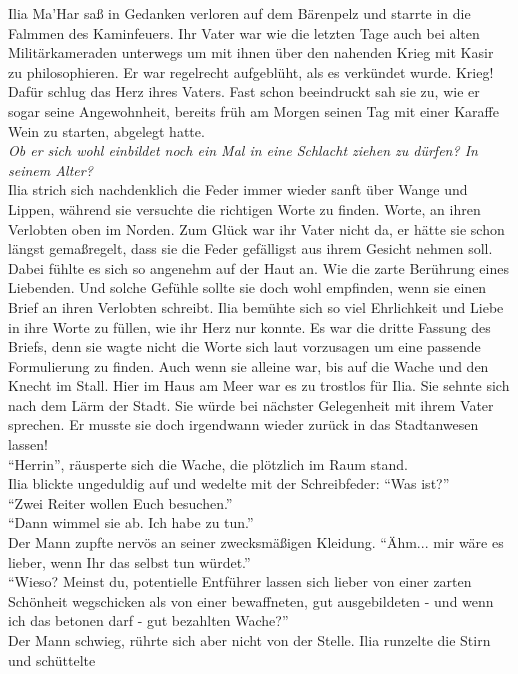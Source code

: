 Ilia Ma'Har saß in Gedanken verloren auf dem Bärenpelz und starrte in die Falmmen des Kaminfeuers. 
Ihr Vater war wie die letzten Tage auch bei alten Militärkameraden unterwegs um mit ihnen über den 
nahenden Krieg mit Kasir zu philosophieren. Er war regelrecht aufgeblüht, als es verkündet wurde. 
Krieg! Dafür schlug das Herz ihres Vaters. Fast schon beeindruckt sah sie zu, wie er sogar seine 
Angewohnheit, bereits früh am Morgen seinen Tag mit einer Karaffe Wein zu starten, abgelegt hatte.\\
\textit{Ob er sich wohl einbildet noch ein Mal in eine Schlacht ziehen zu dürfen? In seinem 
Alter?}\\
Ilia strich sich nachdenklich die Feder immer wieder sanft über Wange und Lippen, während sie 
versuchte die richtigen Worte zu finden. Worte, an ihren Verlobten oben im Norden. Zum Glück war 
ihr Vater nicht da, er hätte sie schon längst gemaßregelt, dass sie die Feder gefälligst aus ihrem 
Gesicht nehmen soll. Dabei fühlte es sich so angenehm auf der Haut an. Wie die zarte Berührung 
eines Liebenden. Und solche Gefühle sollte sie doch wohl empfinden, wenn sie einen Brief an ihren 
Verlobten schreibt. Ilia bemühte sich so viel Ehrlichkeit und Liebe in ihre Worte zu füllen, wie 
ihr Herz nur konnte. Es war die dritte Fassung des Briefs, denn sie wagte nicht die Worte sich laut 
vorzusagen um eine passende Formulierung zu finden. Auch wenn sie alleine war, bis auf die Wache 
und den Knecht im Stall. Hier im Haus am Meer war es zu trostlos für Ilia. Sie sehnte sich nach dem 
Lärm der Stadt. Sie würde bei nächster Gelegenheit mit ihrem Vater sprechen. Er musste sie doch 
irgendwann wieder zurück in das Stadtanwesen lassen!\\
``Herrin'', räusperte sich die Wache, die plötzlich im Raum stand.\\
Ilia blickte ungeduldig auf und wedelte mit der Schreibfeder: ``Was ist?''\\
``Zwei Reiter wollen Euch besuchen.''\\
``Dann wimmel sie ab. Ich habe zu tun.''\\
Der Mann zupfte nervös an seiner zwecksmäßigen Kleidung. ``Ähm... mir wäre es lieber, wenn Ihr das 
selbst tun würdet.''\\
``Wieso? Meinst du, potentielle Entführer lassen sich lieber von einer zarten Schönheit wegschicken 
als von einer bewaffneten, gut ausgebildeten - und wenn ich das betonen darf - gut bezahlten 
Wache?''\\
Der Mann schwieg, rührte sich aber nicht von der Stelle. Ilia runzelte die Stirn und schüttelte 
